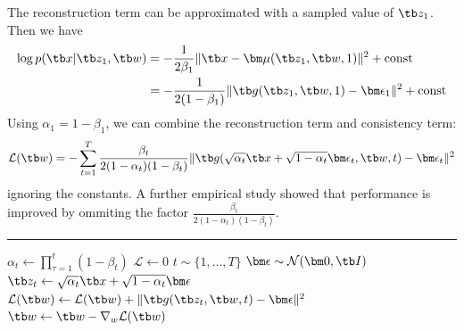 \documentclass{article}
\begin{document}
            The reconstruction term can be approximated with a sampled value of $\tb z_1$. Then we have
            \begin{align*}
                \log{p(\tb x|\tb z_1,\tb w)}
                &=-\frac{1}{2\beta_1}\| \tb x-\bm\mu(\tb z_1,\tb w,1) \|^2 + \text{const}
            \\  &=-\frac{1}{2(1-\beta_1)}\|\tb g(\tb z_1,\tb w,1)-\bm\epsilon_1\|^2 + \text{const}
            \end{align*}
            Using $\alpha_1=1-\beta_1$, we can combine the reconstruction term and consistency term:
            \[
            \mathcal{L}(\tb w)=-\sum_{t=1}^{T}\frac{\beta_t}{2(1-\alpha_t)(1-\beta_t)}\|\tb g(\sqrt{\alpha_t}\tb x + \sqrt{1-\alpha_t}\bm\epsilon_t,\tb w, t) - \bm\epsilon_t\|^2
            \]
            ignoring the constants.
            A further empirical study showed that performance is improved by ommiting the factor $\frac{\beta_t}{2(1-\alpha_t)(1-\beta_t)}$.

            \begin{algorithm}[H]
                \DontPrintSemicolon

                \caption{Denoising diffusion probabilistic model (DDPM) training algorithm}


                \BlankLine
                \hrule
                
                {
                    $\alpha_t \leftarrow \prod_{\tau=1}^{t}(1-\beta_t)$\;
                }
                {
                    $\mathcal{L} \leftarrow 0$\;
                    {
                        $t \sim \{1,\dots,T\}$\;
                        $\bm\epsilon \sim \mathcal{N}(\bm 0, \tb I)$\;
                        $\tb z_t \leftarrow \sqrt{\alpha_t}\tb x + \sqrt{1-\alpha_t}\bm\epsilon$\;
                        $\mathcal{L}(\tb w) \leftarrow \mathcal{L}(\tb w) + \|\tb g(\tb z_t,\tb w, t)-\bm\epsilon\|^2$\;
                    }
                    $\tb w \leftarrow \tb w - \nabla_w\mathcal{L}(\tb w)$\;
                }

            \end{algorithm}
\end{document}
